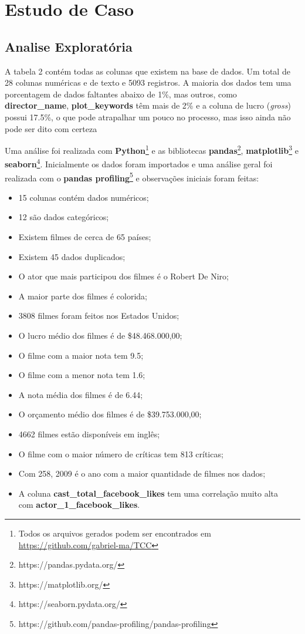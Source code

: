 \section{Estudo de Caso}
\subsection{Analise Exploratória}
A tabela 2 contém todas as colunas que existem na base de dados. Um total de 28 colunas numéricas e de texto e 5093 registros. A maioria dos dados tem uma porcentagem de dados faltantes abaixo de 1\%, mas outros, como \textbf{director\_name}, \textbf{plot\_keywords} têm mais de 2\% e a coluna de lucro (\textit{gross}) possui 17.5\%, o que pode atrapalhar um pouco no processo, mas isso ainda não pode ser dito com certeza


Uma análise foi realizada com \textbf{Python}\footnote{Todos os arquivos gerados podem ser encontrados em \url{https://github.com/gabriel-ma/TCC}} e as bibliotecas \textbf{pandas}\footnote{https://pandas.pydata.org/}, \textbf{matplotlib}\footnote{https://matplotlib.org/} e \textbf{seaborn}\footnote{https://seaborn.pydata.org/}. Inicialmente os dados foram importados e uma análise geral foi realizada com o \textbf{pandas profiling}\footnote{https://github.com/pandas-profiling/pandas-profiling} e observações iniciais foram feitas:
\begin{itemize}
    \item 15 colunas contém dados numéricos;
    \item 12 são dados categóricos;
    \item Existem filmes de cerca de 65 países;
    \item Existem 45 dados duplicados;
    \item O ator que mais participou dos filmes é o Robert De Niro;
    \item A maior parte dos filmes é colorida;
    \item 3808  filmes foram feitos nos Estados Unidos;
    \item O lucro médio dos filmes é de \$48.468.000,00;
    \item O filme com a maior nota tem 9.5;
    \item O filme com a menor nota tem 1.6;
    \item A nota média dos filmes é de 6.44;
    \item O orçamento médio dos filmes é de \$39.753.000,00;
    \item 4662 filmes estão disponíveis em inglês;
    \item O filme com o maior número de críticas tem 813 críticas;
    \item Com 258, 2009 é o ano com a maior quantidade de filmes nos dados;
    \item A coluna \textbf{cast\_total\_facebook\_likes} tem uma correlação muito alta\\ com \textbf{actor\_1\_facebook\_likes}.
\end{itemize}

